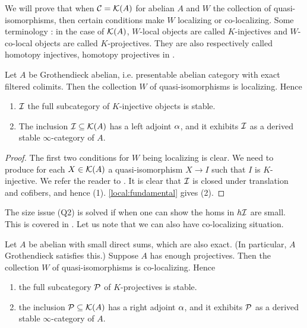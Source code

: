 \documentclass{article}
\begin{document}
We will prove that when $\mathcal{C} = \mathcal{K}(A)$ for abelian $A$ 
and $W$ the collection of quasi-isomorphisms,
then certain conditions make $W$ localizing or co-localizing.
Some terminology : in the case of $\mathcal{K}(A)$,
$W$-local objects are called $K$-injectives 
and $W$-co-local objects are called $K$-projectives.
\cite[\href{https://stacks.math.columbia.edu/tag/070G}{Tag 070G}]{stacks-project}
They are also respectively called homotopy injectives,
homotopy projectives in \cite[Section 14.3]{KS06}.

\begin{prop}
  Let $A$ be Grothendieck abelian,
  i.e. presentable abelian category with exact filtered colimits.
  Then the collection $W$ of quasi-isomorphisms is localizing.
  Hence \begin{enumerate}
    \item $\mathcal{I}$ the full subcategory of
    $K$-injective objects is stable.
    \item The inclusion $\mathcal{I} \subseteq \mathcal{K}(A)$ has a left adjoint
    $\alpha$, and it exhibits $\mathcal{I}$ as a derived stable $\infty$-category of $A$.
  \end{enumerate}
\end{prop}
\begin{proof}
  The first two conditions for $W$ being localizing is clear.
  We need to produce for each $X \in \mathcal{K}(A)$
  a quasi-isomorphism $X \to I$ such that $I$ is $K$-injective.
  We refer the reader to \cite[Theorem 14.3.1]{KS06}.
  It is clear that $\mathcal{I}$ is closed under translation
  and cofibers, and hence (1).
  \ref{local:fundamental} gives (2).
\end{proof}
The size issue (Q2) is solved if when one can show
the homs in $h \mathcal{I}$ are small.
This is covered in \cite[Prop. 1.3.5.14]{lurie-HA}.
Let us note that we can also have co-localizing situation.
\begin{prop}
  Let $A$ be abelian with small direct sums,
  which are also exact. (In particular, $A$ Grothendieck satisfies this.)
  Suppose $A$ has enough projectives.
  Then the collection $W$ of quasi-isomorphisms is co-localizing.
  Hence \begin{enumerate}
    \item the full subcategory $\mathcal{P}$ of $K$-projectives is stable.
    \item the inclusion $\mathcal{P} \subseteq \mathcal{K}(A)$ has a right adjoint $\alpha$,
    and it exhibits $\mathcal{P}$ as a derived stable $\infty$-category of $A$.
  \end{enumerate}
\end{prop}
\end{document}
